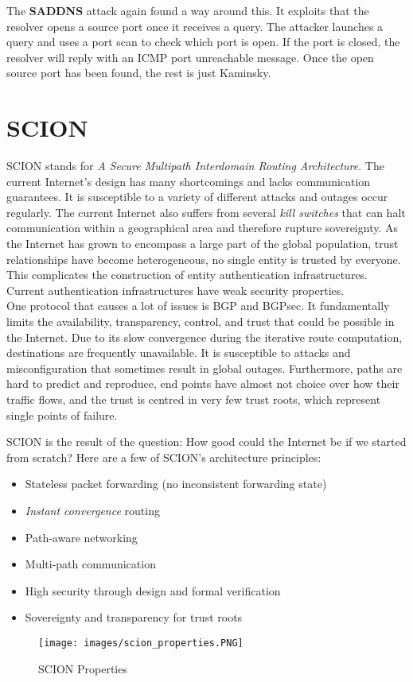 The \textbf{SADDNS} attack again found a way around this. It exploits that the resolver opens a source port once it receives a query. The attacker launches a query and uses a port scan to check which port is open. If the port is closed, the resolver will reply with an ICMP port unreachable message. Once the open source port has been found, the rest is just Kaminsky.


\section{SCION}
SCION stands for \textit{A Secure Multipath Interdomain Routing Architecture}. The current Internet's design has many shortcomings and lacks communication guarantees. It is susceptible to a variety of different attacks and outages occur regularly. The current Internet also suffers from several \textit{kill switches} that can halt communication within a geographical area and therefore rupture sovereignty. As the Internet has grown to encompass a large part of the global population, trust relationships have become heterogeneous, no single entity is trusted by everyone. This complicates the construction of entity authentication infrastructures. Current authentication infrastructures have weak security properties. \vspace{.3cm}\\

One protocol that causes a lot of issues is BGP and BGPsec. It fundamentally limits the availability, transparency, control, and trust that could be possible in the Internet. Due to its slow convergence during the iterative route computation, destinations are frequently unavailable. It is susceptible to attacks and misconfiguration that sometimes result in global outages. Furthermore, paths are hard to predict and reproduce, end points have almost not choice over how their traffic flows, and the trust is centred in very few trust roots, which represent single points of failure.

SCION is the result of the question: How good could the Internet be if we started from scratch? Here are a few of SCION's architecture principles:
\begin{itemize}
\item Stateless packet forwarding (no inconsistent forwarding state)
\item \textit{Instant convergence} routing
\item Path-aware networking
\item Multi-path communication
\item High security through design and formal verification
\item Sovereignty and transparency for trust roots
\end{itemize}
\begin{figure}[H]
\centering
\texttt{[image: images/scion\_properties.PNG]}
\label{scion_properties}
\caption{SCION Properties}
\end{figure}

